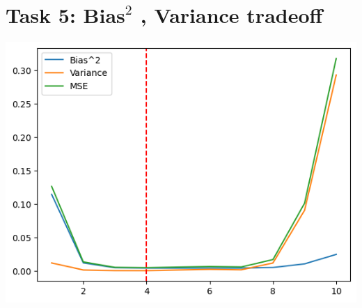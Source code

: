 \documentclass{article}
\begin{document}
\section{Task 5: $\textbf{Bias}^2$ , Variance tradeoff}
\includegraphics{output-1.png}
\end{document}

